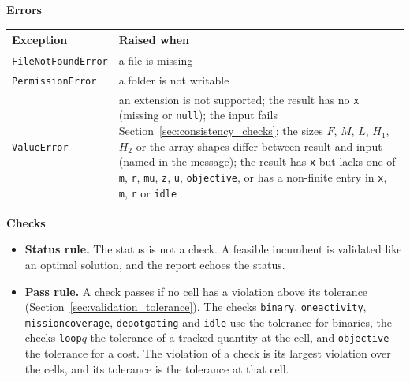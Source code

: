 \documentclass[11pt,a4paper]{article}
\makeatletter
\theoremstyle{plain}
\theoremstyle{definition}
\newcommand{\blockhead}[1]{\par\noindent\textbf{#1}\par\nobreak}
\renewcommand{\_}{\textunderscore\allowbreak{}}
\providecommand{\rejrow}[2]{{\raggedright #1\par} & {\raggedright #2\par} \\}
\providecommand{\tabstart}[2]{\begingroup\small\begin{longtable}{@{}#1@{}}\toprule #2 \\ \midrule \endhead}
\providecommand{\tabend}{\bottomrule\end{longtable}\endgroup}
\makeatother
\begin{document}
\blockhead{Errors}
\tabstart{p{3.4cm}p{11.6cm}}{Exception & Raised when}
\rejrow{\texttt{FileNotFoundError}}{a file is missing}
\rejrow{\texttt{PermissionError}}{a folder is not writable}
\rejrow{\texttt{ValueError}}{an extension is not supported; the result has no \texttt{x} (missing or \texttt{null}); the input fails Section~\ref{sec:consistency_checks}; the sizes $F$, $M$, $L$, $H_1$, $H_2$ or the array shapes differ between result and input (named in the message); the result has \texttt{x} but lacks one of \texttt{m}, \texttt{r}, \texttt{mu}, \texttt{z}, \texttt{u}, \texttt{objective}, or has a non-finite entry in \texttt{x}, \texttt{m}, \texttt{r} or \texttt{idle}}
\tabend

\blockhead{Checks}
\begin{itemize}[nosep]
  \item \textbf{Status rule.} The status is not a check. A feasible incumbent is validated like an optimal solution, and the report echoes the status.
  \item \textbf{Pass rule.} A check passes if no cell has a violation above its tolerance (Section~\ref{sec:validation_tolerance}). The checks \texttt{binary}, \texttt{one\_activity}, \texttt{mission\_coverage}, \texttt{depot\_gating} and \texttt{idle} use the tolerance for binaries, the checks \texttt{loop\_}$q$ the tolerance of a tracked quantity at the cell, and \texttt{objective} the tolerance for a cost. The violation of a check is its largest violation over the cells, and its tolerance is the tolerance at that cell.
\end{itemize}
\end{document}
